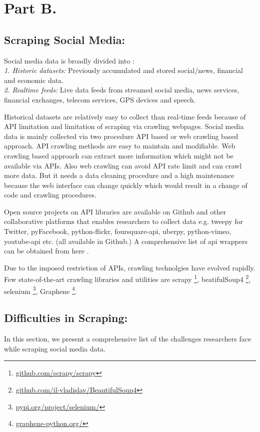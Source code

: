 \section{Part B.}
\subsection*{Scraping Social Media:}
Social media data is broadly divided into
 \cite{batrinca2015social} :\\
{\em1. Historic datasets:} Previously accumulated and stored social/news, financial and economic data. \\
{\em2. Realtime feeds:} Live data feeds from streamed social media, news services, financial exchanges, telecom services, GPS devices and speech.

Historical datasets are relatively easy to collect than real-time feeds because of API limitation and limitation of scraping via crawling webpages. Social media data is mainly collected via two procedure API based or web crawling based approach. API crawling methods are easy to maintain and modifiable. Web crawling based approach can extract more information which might not be available via APIs. Also web crawling can avoid API rate limit and can crawl more data. But it needs a data cleaning procedure and a high maintenance because the web interface can change quickly which would result in a change of code and crawling procedures.

Open source projects on API libraries are available on Github and other collaborative platforms that enables researchers to collect data e.g. tweepy for Twitter, pyFacebook, python-flickr, foursquare-api, uberpy, python-vimeo, youtube-api etc. (all available in Github.) A comprehensive list of api wrappers can be obtained from here \cite{api_wrappers}.

Due to the imposed restriction of APIs, crawling technolgies have evolved rapidly. Few state-of-the-art crawling libraries and utilities are scrapy \footnote{\href{https://github.com/scrapy/scrapy}{github.com/scrapy/scrapy}}, beatifulSoup4 \footnote{\href{https://github.com/il-vladislav/BeautifulSoup4}{github.com/il-vladislav/BeautifulSoup4}}, selenium \footnote{\href{https://pypi.org/project/selenium/}{pypi.org/project/selenium/}}, Graphene \footnote{\href{https://graphene-python.org/}{graphene-python.org/}}.


\subsection*{Difficulties in Scraping:}
In this section, we present a comprehensive list of the challenges researchers face while scraping social media data.


